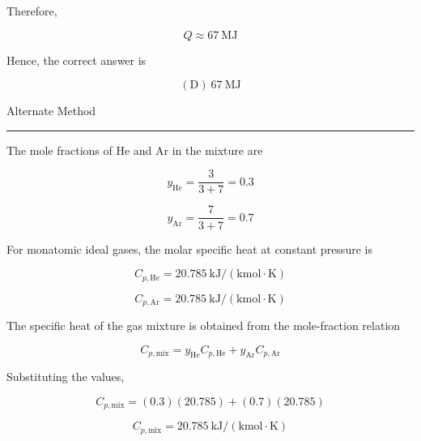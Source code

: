 \documentclass[12pt]{article}
\begin{document}
Therefore,

\begin{equation*}
\boxed{Q\approx67\ \mathrm{MJ}}
\end{equation*}

Hence, the correct answer is

\begin{equation*}
\boxed{\mathrm{(D)}\ 67\ \mathrm{MJ}}
\end{equation*}

\newpage

\begin{center}
\Large{Alternate Method\\}  
\end{center}
\hrule

\vspace*{0.2cm}
The mole fractions of He and Ar in the mixture are

\begin{equation*}
y_{\mathrm{He}}=\frac{3}{3+7}=0.3
\end{equation*}

\begin{equation*}
y_{\mathrm{Ar}}=\frac{7}{3+7}=0.7
\end{equation*}

For monatomic ideal gases, the molar specific heat at constant pressure is

\begin{equation*}
C_{p,\mathrm{He}}=20.785\ \mathrm{kJ/(kmol\cdot K)}
\end{equation*}

\begin{equation*}
C_{p,\mathrm{Ar}}=20.785\ \mathrm{kJ/(kmol\cdot K)}
\end{equation*}

The specific heat of the gas mixture is obtained from the mole-fraction relation

\begin{equation*}
C_{p,\mathrm{mix}}
=
y_{\mathrm{He}}C_{p,\mathrm{He}}
+
y_{\mathrm{Ar}}C_{p,\mathrm{Ar}}
\end{equation*}

Substituting the values,

\begin{equation*}
C_{p,\mathrm{mix}}
=
(0.3)(20.785)+(0.7)(20.785)
\end{equation*}

\begin{equation*}
C_{p,\mathrm{mix}}
=
20.785\ \mathrm{kJ/(kmol\cdot K)}
\end{equation*}
\end{document}
